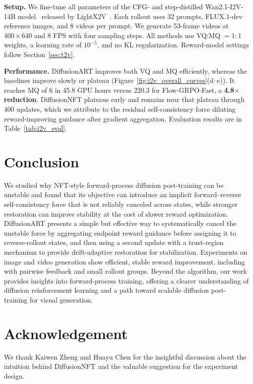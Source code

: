 \documentclass{article}
\begin{document}
\noindent\textbf{Setup.}
We fine-tune all parameters of the CFG- and step-distilled Wan2.1-I2V-14B model~\citep{wan2025video} released by LightX2V~\citep{lightx2v2025}. Each rollout uses 32 prompts, FLUX.1-dev reference images, and 8 videos per prompt. We generate 53-frame videos at $400\times640$ and 8 FPS with four sampling steps. All methods use VQ:MQ $=1{:}1$ weights, a learning rate of $10^{-5}$, and no KL regularization. Reward-model settings follow Section~\ref{sec:t2v}.

\noindent\textbf{Performance.}
DiffusionART improves both VQ and MQ efficiently, whereas the baselines improve slowly or plateau (Figure~\ref{fig:i2v_overall_curves}(d--e)). It reaches MQ of 6 in 45.8 GPU hours versus 220.3 for Flow-GRPO-Fast, a \textbf{4.8$\times$ reduction}. DiffusionNFT plateaus early and remains near that plateau through 400 updates, which we attribute to the residual self-consistency force diluting reward-improving guidance after gradient aggregation. Evaluation results are in Table~\ref{tab:i2v_eval}.

\section{Conclusion}
We studied why NFT-style forward-process diffusion post-training can be unstable and found that its objective can introduce an implicit forward--reverse
self-consistency force that is not reliably canceled across states, while stronger restoration can improve stability at the cost of slower reward optimization. DiffusionART presents a simple but effective way to systematically cancel the unstable force by aggregating endpoint reward guidance before assigning it to reverse-rollout states, and then using a second update with a trust-region mechanism to provide drift-adaptive restoration for stabilization. Experiments on image and video generation show efficient, stable reward improvement, including with pairwise feedback and small rollout groups. Beyond the algorithm, our work provides insights into forward-process training, offering a clearer understanding of diffusion reinforcement learning and a path toward scalable diffusion post-training for visual generation.



\section{Acknowledgement}
We thank Kaiwen Zheng and Huayu Chen for the insightful discussion about the intuition behind DiffusionNFT and the valuable suggestion for the experiment design.
\end{document}
